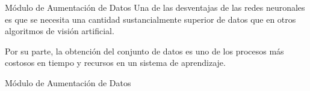 \documentclass[10pt]{beamer}
\begin{document}
\begin{frame}{Módulo de Aumentación de Datos}
    Una de las desventajas de las redes neuronales es que se necesita una 
    cantidad sustancialmente superior de datos que en otros algoritmos de visión 
    artificial.

    Por su parte, la obtención del conjunto de datos es uno de los procesos más costosos en tiempo 
    y recursos en un sistema de aprendizaje.

\end{frame}

\begin{frame}{Módulo de Aumentación de Datos}
    \begin{table}[!h]
        \centering
        \caption[Transformaciones realizadas en la aumentación de datos.]{Transformaciones realizadas en la aumentación de datos. Fuente: Elaboración propia.}
    \end{table}

\end{frame}
\end{document}
